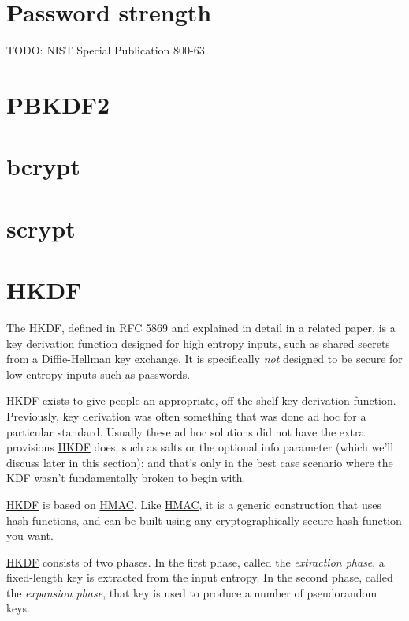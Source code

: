 \documentclass[11pt,ebook,table,dvipsnames]{memoir}
\begin{document}
\section{Password strength}
\label{sec-2-9-2}

TODO: NIST Special Publication 800-63
\section{\label{PBKDF2}PBKDF2}
\label{sec-2-9-3}

\section{\label{bcrypt}bcrypt}
\label{sec-2-9-4}

\section{\label{scrypt}scrypt}
\label{sec-2-9-5}

\section{\label{HKDF}HKDF}
\label{sec-2-9-6}

The \gls{HKDF}, defined in RFC 5869\cite{rfc5869} and explained in
detail in a related paper\cite{hkdf}, is a key derivation function
designed for high entropy inputs, such as shared secrets from a
Diffie-Hellman key exchange. It is specifically \emph{not} designed to be
secure for low-entropy inputs such as passwords.

\hyperref[HKDF]{HKDF} exists to give people an appropriate, off-the-shelf key
derivation function. Previously, key derivation was often something
that was done ad hoc for a particular standard. Usually these ad hoc
solutions did not have the extra provisions \hyperref[HKDF]{HKDF} does, such as
\glspl{salt} or the optional info parameter (which we'll discuss later
in this section); and that's only in the best case scenario where the
KDF wasn't fundamentally broken to begin with.

\hyperref[HKDF]{HKDF} is based on \hyperref[HMAC]{HMAC}. Like \hyperref[HMAC]{HMAC}, it is a generic construction that
uses hash functions, and can be built using any cryptographically
secure hash function you want.

\hyperref[HKDF]{HKDF} consists of two phases. In the first phase, called the
\emph{extraction phase}, a fixed-length key is extracted from the input
entropy. In the second phase, called the \emph{expansion phase}, that key
is used to produce a number of pseudorandom keys.
\end{document}
